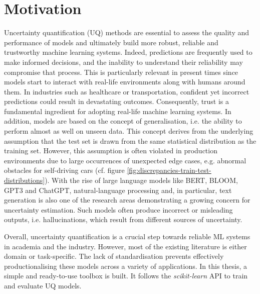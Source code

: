 

\section{Motivation} \label{intro:motivation}


Uncertainty quantification (UQ) methods are essential to assess the quality and performance of models and ultimately build more robust, reliable and trustworthy machine learning systems. Indeed, predictions are frequently used to make informed decisions, and the inability to understand their reliability may compromise that process. This is particularly relevant in present times since models start to interact with real-life environments along with humans around them. In industries such as healthcare or transportation, confident yet incorrect predictions could result in devastating outcomes. Consequently, trust is a fundamental ingredient for adopting real-life machine learning systems.
In addition, models are based on the concept of generalisation, i.e. the ability to perform almost as well on unseen data. This concept derives from the underlying assumption that the test set is drawn from the same statistical distribution as the training set. However, this assumption is often violated in production environments due to large occurrences of unexpected edge cases, e.g. abnormal obstacles for self-driving cars (cf. figure \ref{fig:discrepancies-train-test-distributions}).
With the rise of large language models like BERT, BLOOM, GPT3 and ChatGPT, natural-language processing and, in particular, text generation is also one of the research areas demonstrating a growing concern for uncertainty estimation. Such models often produce incorrect or misleading outputs, i.e. hallucinations, which result from different sources of uncertainty. 

Overall, uncertainty quantification is a crucial step towards reliable ML systems in academia and the industry. However, most of the existing literature is either domain or task-specific.
The lack of standardisation prevents effectively productionalising these models across a variety of applications\cite{surveyUQinDL}. In this thesis, a simple and ready-to-use toolbox is built. It follows the \textit{scikit-learn} API to train and evaluate UQ models. 

